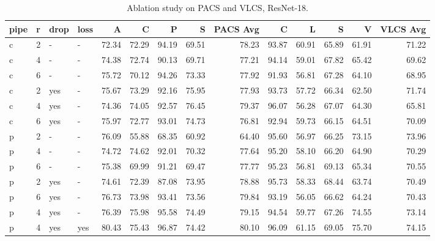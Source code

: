 \documentclass{article}
\begin{document}
\begin{table}[htbp]
\centering
\caption{Ablation study on PACS and VLCS, ResNet-18.}
\tiny
\begin{adjustbox}{max width=\textwidth}
\begin{tabular}{llllrrrrrrrrrr}
\toprule
pipe & r & drop & loss & A & C & P & S & PACS Avg & C & L & S & V & VLCS Avg \\
\midrule
c & 2 & - & - & 72.34 & 72.29 & 94.19 & 69.51 & 78.23 & 93.87 & 60.91 & 65.89 & 61.91 & 71.22 \\
c & 4 & - & - & 74.38 & 72.74 & 90.13 & 69.71 & 77.21 & 94.14 & 59.01 & 67.82 & 65.42 & 69.62 \\
c & 6 & - & - & 75.72 & 70.12 & 94.26 & 73.33 & 77.92 & 91.93 & 56.81 & 67.28 & 64.10 & 68.95 \\
c & 2 & yes & - & 75.67 & 73.29 & 92.16 & 75.95 & 77.93 & 93.73 & 57.72 & 66.34 & 62.50 & 71.74 \\
c & 4 & yes & - & 74.36 & 74.05 & 92.57 & 76.45 & 79.37 & 96.07 & 56.28 & 67.07 & 64.30 & 65.81 \\
c & 6 & yes & - & 75.97 & 72.77 & 93.01 & 74.73 & 76.81 & 92.94 & 59.73 & 66.15 & 64.51 & 70.09 \\
p & 2 & - & - & 76.09 & 55.88 & 68.35 & 60.92 & 64.40 & 95.60 & 56.97 & 66.25 & 73.15 & 73.96 \\
p & 4 & - & - & 74.72 & 74.62 & 92.01 & 70.32 & 77.64 & 95.20 & 58.10 & 66.20 & 64.90 & 70.29 \\
p & 6 & - & - & 75.38 & 69.99 & 91.21 & 69.47 & 77.77 & 95.23 & 56.81 & 69.13 & 65.34 & 70.55 \\
p & 2 & yes & - & 74.61 & 72.39 & 87.08 & 73.95 & 78.88 & 95.73 & 58.33 & 68.44 & 63.74 & 70.49 \\
p & 6 & yes & - & 76.73 & 73.98 & 93.41 & 73.56 & 79.84 & 93.19 & 56.05 & 66.62 & 64.24 & 70.43 \\
p & 4 & yes & - & 76.39 & 75.98 & 95.58 & 74.49 & 79.15 & 94.54 & 59.77 & 67.26 & 74.55 & 73.14 \\
p & 4 & yes & yes & 80.43 & 75.43 & 96.87 & 74.42 & 80.10 & 96.09 & 61.15 & 69.05 & 75.70 & 74.15 \\
\bottomrule
\end{tabular}
\end{adjustbox}
\end{table}
\end{document}
